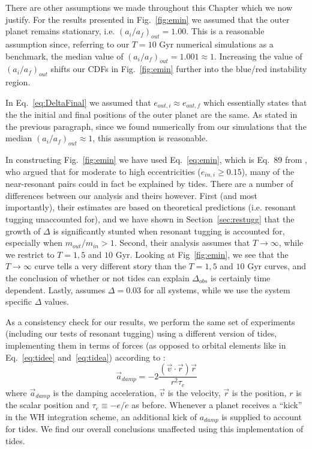 There are other assumptions we made throughout this Chapter which we now justify.
For the results presented in Fig.~\ref{fig:emin} we assumed that the outer planet remains stationary, i.e. $(a_i /a_f)_{out} = 1.00$. 
This is a reasonable assumption since, referring to our $T = 10$ Gyr numerical simulations as a benchmark, the median value of $(a_i /a_f)_{out} = 1.001 \approx 1$.
Increasing the value of $(a_i /a_f)_{out}$ shifts our CDFs in Fig.~\ref{fig:emin} further into the blue/red instability region. 

In Eq.~\ref{eq:DeltaFinal} we assumed that $e_{out,i} \approx e_{out,f}$ which essentially states that the the initial and final positions of the outer planet are the same. 
As stated in the previous paragraph, since we found numerically from our simulations that the median $(a_i /a_f)_{out} \approx 1$, this assumption is reasonable. 

In constructing Fig.~\ref{fig:emin} we have used Eq.~\ref{eq:emin}, which is Eq.~89 from \cite{Delisle2014}, who argued that for moderate to high eccentricities ($e_{in,i} \geq 0.15$), many of the near-resonant pairs could in fact be explained by tides. 
There are a number of differences between our analysis and theirs however. 
First (and most importantly), their estimates are based on theoretical predictions (i.e. resonant tugging unaccounted for), and we have shown in Section~\ref{sec:restugg} that the growth of $\Delta$ is significantly stunted when resonant tugging is accounted for, especially when $m_{out} / m_{in} > 1$.
Second, their analysis assumes that $T \rightarrow \infty$, while we restrict to $T = 1, 5$ and $10$ Gyr. 
Looking at Fig~\ref{fig:emin}, we see that the $T \rightarrow \infty$ curve tells a very different story than the $T = 1, 5$ and $10$ Gyr curves, and the conclusion of whether or not tides can explain $\Delta_{obs}$ is certainly time dependent.
Lastly, \citeauthor{Delisle2014} assumes $\Delta = 0.03$ for all systems, while we use the system specific $\Delta$ values.

As a consistency check for our results, we perform the same set of experiments (including our tests of resonant tugging) using a different version of tides, implementing them in terms of forces (as opposed to orbital elements like in Eq.~\ref{eq:tidee} and~\ref{eq:tidea}) according to \cite{Papaloizou2000}:
\begin{equation}
\vec{a}_{damp} = -2\frac{(\vec{v} \cdot \vec{r}) \vec{r}}{r^2 \tau_e}
\label{eq:tideF}
\end{equation}
where $\vec{a}_{damp}$ is the damping acceleration, $\vec{v}$ is the velocity, $\vec{r}$ is the position, $r$ is the scalar position and $\tau_e \equiv - e/\dot{e}$ as before. 
Whenever a planet receives a ``kick'' in the WH integration scheme, an additional kick of $a_{damp}$ is supplied to account for tides. 
We find our overall conclusions unaffected using this implementation of tides.

